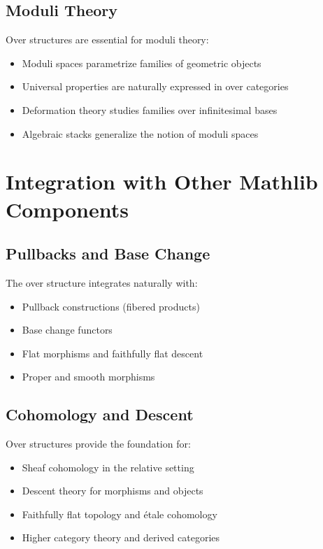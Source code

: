 \documentclass{article}
\theoremstyle{definition}
\begin{document}
\subsection{Moduli Theory}

Over structures are essential for moduli theory:
\begin{itemize}
\item Moduli spaces parametrize families of geometric objects
\item Universal properties are naturally expressed in over categories
\item Deformation theory studies families over infinitesimal bases
\item Algebraic stacks generalize the notion of moduli spaces
\end{itemize}

\section{Integration with Other Mathlib Components}

\subsection{Pullbacks and Base Change}

The over structure integrates naturally with:
\begin{itemize}
\item Pullback constructions (fibered products)
\item Base change functors
\item Flat morphisms and faithfully flat descent
\item Proper and smooth morphisms
\end{itemize}

\subsection{Cohomology and Descent}

Over structures provide the foundation for:
\begin{itemize}
\item Sheaf cohomology in the relative setting
\item Descent theory for morphisms and objects
\item Faithfully flat topology and étale cohomology
\item Higher category theory and derived categories
\end{itemize}
\end{document}
